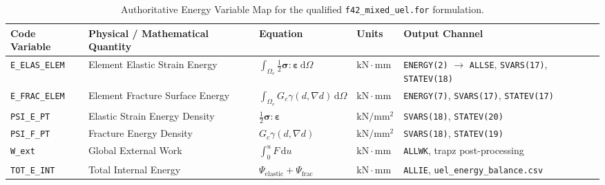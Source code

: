 \begin{table}[htbp]
\centering
\caption{Authoritative Energy Variable Map for the qualified \texttt{f42\_mixed\_uel.for} formulation.}
\label{tab:energy_variable_map}
\small
\begin{tabularx}{\textwidth}{lXllp{3.5cm}}
\toprule
Code Variable & Physical / Mathematical Quantity & Equation & Units & Output Channel \\
\midrule
\texttt{E\_ELAS\_ELEM} & Element Elastic Strain Energy & $\int_{\Omega_e} \frac{1}{2}\boldsymbol{\sigma}:\boldsymbol{\varepsilon}\,\mathrm{d}\Omega$ & $\mathrm{kN\cdot mm}$ & \texttt{ENERGY(2)} $\rightarrow$ \texttt{ALLSE}, \texttt{SVARS(17)}, \texttt{STATEV(18)} \\
\texttt{E\_FRAC\_ELEM} & Element Fracture Surface Energy & $\int_{\Omega_e} G_c \gamma(d,\nabla d)\,\mathrm{d}\Omega$ & $\mathrm{kN\cdot mm}$ & \texttt{ENERGY(7)}, \texttt{SVARS(17)}, \texttt{STATEV(17)} \\
\texttt{PSI\_E\_PT} & Elastic Strain Energy Density & $\frac{1}{2}\boldsymbol{\sigma}:\boldsymbol{\varepsilon}$ & $\mathrm{kN/mm^2}$ & \texttt{SVARS(18)}, \texttt{STATEV(20)} \\
\texttt{PSI\_F\_PT} & Fracture Energy Density & $G_c \gamma(d,\nabla d)$ & $\mathrm{kN/mm^2}$ & \texttt{SVARS(18)}, \texttt{STATEV(19)} \\
\texttt{W\_ext} & Global External Work & $\int_0^u F\,\mathrm{d}u$ & $\mathrm{kN\cdot mm}$ & \texttt{ALLWK}, trapz post-processing \\
\texttt{TOT\_E\_INT} & Total Internal Energy & $\Psi_{\mathrm{elastic}}+\Psi_{\mathrm{frac}}$ & $\mathrm{kN\cdot mm}$ & \texttt{ALLIE}, \texttt{uel\_energy\_balance.csv} \\
\bottomrule
\end{tabularx}
\end{table}

